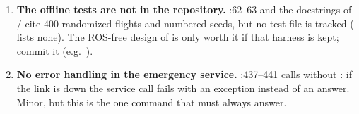 \begin{review}
\begin{enumerate}[leftmargin=*,itemsep=3pt]
\item \textbf{The offline tests are not in the repository.} :62--63 and the docstrings of
/ cite 400 randomized flights and numbered seeds, but no test file is tracked
( lists none). The ROS-free design of  is only worth it if that harness is
kept; commit it (e.g.\ ).

\item \textbf{No error handling in the emergency service.} :437--441 calls
 without : if the link is down the service call fails with an exception instead of
an answer. Minor, but this is the one command that must always answer.
\end{enumerate}
\end{review}

